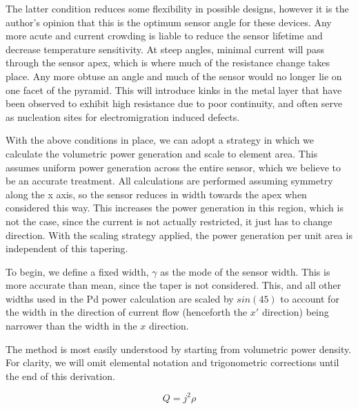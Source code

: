 \documentclass[]{report}
\begin{document}
The latter condition reduces some flexibility in possible designs, however it is the author's opinion that this is the optimum sensor angle for these devices. Any more acute and current crowding is liable to reduce the sensor lifetime and decrease temperature sensitivity. At steep angles, minimal current will pass through the sensor apex, which is where much of the resistance change takes place. Any more obtuse an angle and much of the sensor would no longer lie on one facet of the pyramid. This will introduce kinks in the metal layer that have been observed to exhibit high resistance due to poor continuity, and often serve as nucleation sites for electromigration induced defects.

With the above conditions in place, we can adopt a strategy in which we calculate the volumetric power generation and scale to element area. This assumes uniform power generation across the entire sensor, which we believe to be an accurate treatment. All calculations are performed assuming symmetry along the x axis, so the sensor reduces in width towards the apex when considered this way. This increases the power generation in this region, which is not the case, since the current is not actually restricted, it just has to change direction. With the scaling strategy applied, the power generation per unit area is independent of this tapering.

To begin, we define a fixed width, $\gamma$ as the mode of the sensor width. This is more accurate than mean, since the taper is not considered. This, and all other widths used in the Pd power calculation are scaled by $sin(45)$ to account for the width in the direction of current flow (henceforth the $x'$ direction) being narrower than the width in the $x$ direction.





The method is most easily understood by starting from volumetric power density. For clarity, we will omit elemental notation and trigonometric corrections until the end of this derivation.

\begin{equation}\label{eq:init}
Q = j^2\rho
\end{equation}
\end{document}
